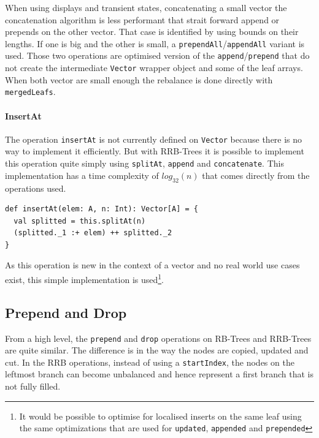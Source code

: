 When using displays and transient states, concatenating a small vector the concatenation algorithm is less performant that strait forward append or prepends on the other vector. That case is identified by using bounds on their lengths. If one is big and the other is small, a \texttt{prependAll}/\texttt{appendAll} variant is used. Those two operations are optimised version of the \texttt{append}/\texttt{prepend} that do not create the intermediate \texttt{Vector} wrapper object and some of the leaf arrays. When both vector are small enough the rebalance is done directly with \texttt{mergedLeafs}.

\paragraph{InsertAt}
The operation \texttt{insertAt} is not currently defined on \texttt{Vector} because there is no way to implement it efficiently. But with RRB-Trees it is possible to implement this operation quite simply using \texttt{splitAt}, \texttt{append} and \texttt{concatenate}. This implementation has a time complexity of $log_{32}(n)$ that comes directly from the operations used.

\begin{lstlisting}[frame=single]
def insertAt(elem: A, n: Int): Vector[A] = {
  val splitted = this.splitAt(n)
  (splitted._1 :+ elem) ++ splitted._2
}
\end{lstlisting}

As this operation is new in the context of a vector and no real world use cases exist, this simple implementation is used\footnote{It would be possible to optimise for localised inserts on the same leaf using the same optimizations that are used for \texttt{updated}, \texttt{appended} and \texttt{prepended}}.

\subsection{Prepend and Drop}
From a high level, the \texttt{prepend} and \texttt{drop} operations on RB-Trees and RRB-Trees are quite similar. The difference is in the way the nodes are copied, updated and cut. In the RRB operations, instead of using a \texttt{startIndex}, the nodes on the leftmost branch can become unbalanced and hence represent a first branch that is not fully filled.

